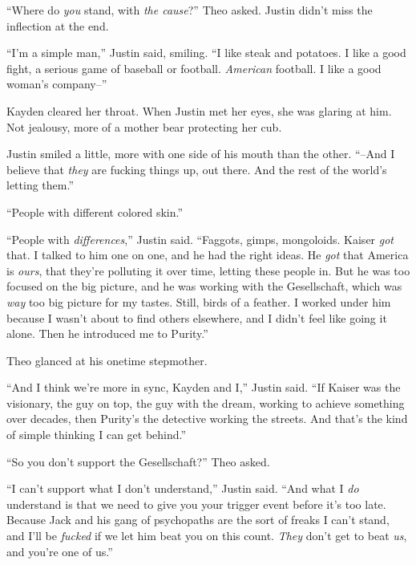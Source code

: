 ``Where do \emph{you} stand, with \emph{the cause}?''  Theo asked.  Justin didn't miss the inflection at the end.



``I'm a simple man,'' Justin said, smiling.  ``I like steak and potatoes.  I like a good fight, a serious game of baseball or football.  \emph{American} football.  I like a good woman's company--''



Kayden cleared her throat.  When Justin met her eyes, she was glaring at him.  Not jealousy, more of a mother bear protecting her cub.



Justin smiled a little, more with one side of his mouth than the other.  ``--And I believe that \emph{they} are fucking things up, out there.  And the rest of the world's letting them.''



``People with different colored skin.''



``People with \emph{differences},'' Justin said.  ``Faggots, gimps, mongoloids.  Kaiser \emph{got} that.  I talked to him one on one, and he had the right ideas.  He \emph{got} that America is \emph{ours}, that they're polluting it over time, letting these people in.  But he was too focused on the big picture, and he was working with the Gesellschaft, which was \emph{way} too big picture for my tastes.  Still, birds of a feather.  I worked under him because I wasn't about to find others elsewhere, and I didn't feel like going it alone.  Then he introduced me to Purity.''



Theo glanced at his onetime stepmother.



``And I think we're more in sync, Kayden and I,'' Justin said.  ``If Kaiser was the visionary, the guy on top, the guy with the dream, working to achieve something over decades, then Purity's the detective working the streets.  And that's the kind of simple thinking I can get behind.''



``So you don't support the Gesellschaft?''  Theo asked.



``I can't support what I don't understand,'' Justin said.  ``And what I \emph{do} understand is that we need to give you your trigger event before it's too late.  Because Jack and his gang of psychopaths are the sort of freaks I can't stand, and I'll be \emph{fucked} if we let him beat you on this count.  \emph{They} don't get to beat \emph{us}, and you're one of us.''



